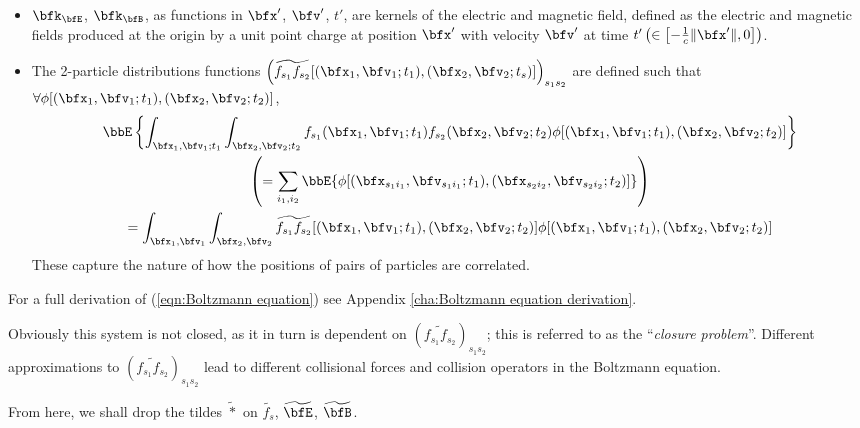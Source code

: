    \begin{itemize}
        \item  $\bfk_{\bfE}$, $\bfk_{\bfB}$, as functions in $\bfx'$, $\bfv'$, $t'$, are kernels of the electric and magnetic field, defined as the electric and magnetic fields produced at the origin by a unit point charge at position $\bfx'$ with velocity $\bfv'$ at time $t' \left(\in \left[-\frac{1}{c}\|\bfx'\|, 0\right]\right)$. 
        
        \item  The 2-particle distributions functions $\left(\widetilde{f_{s_{1}}f_{s_{2}}}[(\bfx_{1}, \bfv_{1}; t_{1}), (\bfx_{2}, \bfv_{2}; t_{s})]\right)_{s_{1}s_{2}}$ are defined such that $\forall \phi[(\bfx_{1}, \bfv_{1}; t_{1}), (\bfx_{2}, \bfv_{2}; t_{2})]$,
        \begin{multline}
            \bbE\left\{\int_{\bfx_{1}, \bfv_{1}; t_{1}}\int_{\bfx_{2}, \bfv_{2}; t_{2}}f_{s_{1}}(\bfx_{1}, \bfv_{1}; t_{1})f_{s_{2}}(\bfx_{2}, \bfv_{2}; t_{2})\phi[(\bfx_{1}, \bfv_{1}; t_{1}), (\bfx_{2}, \bfv_{2}; t_{2})]\right\}  \\
            \left(=  \sum_{i_{1}, i_{2}}\bbE\{\phi[(\bfx_{s_{1}i_{1}}, \bfv_{s_{1}i_{1}}; t_{1}), (\bfx_{s_{2}i_{2}}, \bfv_{s_{2}i_{2}}; t_{2})]\}\right)  \\
            =  \int_{\bfx_{1}, \bfv_{1}}\int_{\bfx_{2}, \bfv_{2}}\widetilde{f_{s_{1}}f_{s_{2}}}[(\bfx_{1}, \bfv_{1}; t_{1}), (\bfx_{2}, \bfv_{2}; t_{2})]\phi[(\bfx_{1}, \bfv_{1}; t_{1}), (\bfx_{2}, \bfv_{2}; t_{2})]
        \end{multline}
        These capture the nature of how the positions of pairs of particles are correlated.
    \end{itemize}
    For a full derivation of (\ref{eqn:Boltzmann equation}) see Appendix \ref{cha:Boltzmann equation derivation}.

    Obviously this system is not closed, as it in turn is dependent on $\left(\widetilde{f_{s_{1}}f_{s_{2}}}\right)_{s_{1}s_{2}}$; this is referred to as the ``\emph{closure problem}''. Different approximations to $\left(\widetilde{f_{s_{1}}f_{s_{2}}}\right)_{s_{1}s_{2}}$ lead to different collisional forces and collision operators in the Boltzmann equation.

    From here, we shall drop the tildes $\widetilde{*}$ on $\widetilde{f_{s}}$, $\widetilde{\bfE}$, $\widetilde{\bfB}$.
    